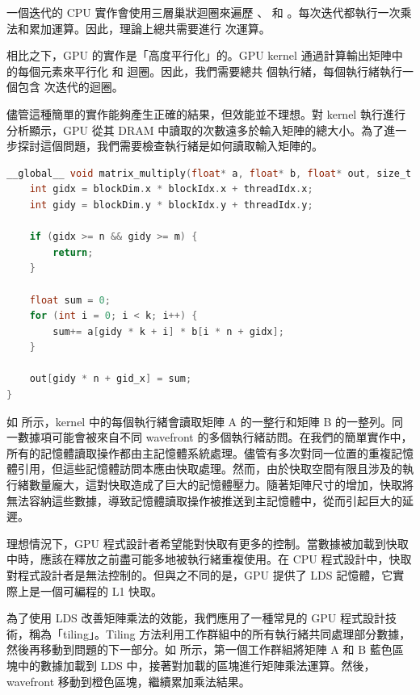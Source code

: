 一個迭代的 CPU 實作會使用三層巢狀迴圈來遍歷 、 和 。每次迭代都執行一次乘法和累加運算。因此，理論上總共需要進行  次運算。

相比之下，GPU 的實作是「高度平行化」的。GPU kernel 通過計算輸出矩陣中的每個元素來平行化  和  迴圈。因此，我們需要總共  個執行緒，每個執行緒執行一個包含  次迭代的迴圈。

儘管這種簡單的實作能夠產生正確的結果，但效能並不理想。對 kernel 執行進行分析顯示，GPU 從其 DRAM 中讀取的次數遠多於輸入矩陣的總大小。為了進一步探討這個問題，我們需要檢查執行緒是如何讀取輸入矩陣的。

\begin{lstlisting}[language=C, caption={簡單的 HIP kernel 用於矩陣乘法。}, captionpos=t, label={lst:naive}]
__global__ void matrix_multiply(float* a, float* b, float* out, size_t m, size_t n, size_t k) {
    int gidx = blockDim.x * blockIdx.x + threadIdx.x;
    int gidy = blockDim.y * blockIdx.y + threadIdx.y;

    if (gidx >= n && gidy >= m) {
        return;
    }

    float sum = 0;
    for (int i = 0; i < k; i++) {
        sum+= a[gidy * k + i] * b[i * n + gidx];
    }

    out[gidy * n + gid_x] = sum;
}
\end{lstlisting}

如  所示，kernel 中的每個執行緒會讀取矩陣 A 的一整行和矩陣 B 的一整列。同一數據項可能會被來自不同 wavefront 的多個執行緒訪問。在我們的簡單實作中，所有的記憶體讀取操作都由主記憶體系統處理。儘管有多次對同一位置的重複記憶體引用，但這些記憶體訪問本應由快取處理。然而，由於快取空間有限且涉及的執行緒數量龐大，這對快取造成了巨大的記憶體壓力。隨著矩陣尺寸的增加，快取將無法容納這些數據，導致記憶體讀取操作被推送到主記憶體中，從而引起巨大的延遲。

理想情況下，GPU 程式設計者希望能對快取有更多的控制。當數據被加載到快取中時，應該在釋放之前盡可能多地被執行緒重複使用。在 CPU 程式設計中，快取對程式設計者是無法控制的。但與之不同的是，GPU 提供了 LDS 記憶體，它實際上是一個可編程的 L1 快取。

為了使用 LDS 改善矩陣乘法的效能，我們應用了一種常見的 GPU 程式設計技術，稱為「tiling」。Tiling 方法利用工作群組中的所有執行緒共同處理部分數據，然後再移動到問題的下一部分。如  所示，第一個工作群組將矩陣 A 和 B 藍色區塊中的數據加載到 LDS 中，接著對加載的區塊進行矩陣乘法運算。然後，wavefront 移動到橙色區塊，繼續累加乘法結果。

